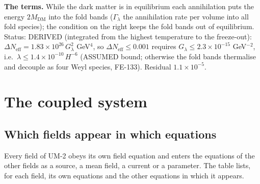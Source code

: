 \documentclass[
  10pt,
]{article}
\begin{document}
\textbf{The terms.} While the dark matter is in equilibrium each
annihilation puts the energy \(2M_{\mathrm{DM}}\) into the fold bands
(\(\Gamma_\lambda\) the annihilation rate per volume into all fold
species); the condition on the right keeps the fold bands out of
equilibrium. Status: DERIVED (integrated from the highest temperature to
the freeze-out):
\(\Delta N_{\mathrm{eff}} = 1.83\times10^{26}\,G_\lambda^2\) GeV\(^4\),
so \(\Delta N_{\mathrm{eff}} \le 0.001\) requires
\(G_\lambda \le 2.3\times10^{-15}\) GeV\(^{-2}\),
i.e.~\(\lambda \le 1.4\times10^{-10}\,H^{-6}\) (ASSUMED bound; otherwise
the fold bands thermalise and decouple as four Weyl species, FE-133).
Residual \(1.1\times10^{-5}\).

\hypertarget{the-coupled-system}{%
\section{The coupled system}\label{the-coupled-system}}

\hypertarget{which-fields-appear-in-which-equations}{%
\subsection{Which fields appear in which
equations}\label{which-fields-appear-in-which-equations}}

Every field of UM-2 obeys its own field equation and enters the
equations of the other fields as a source, a mean field, a current or a
parameter. The table lists, for each field, its own equations and the
other equations in which it appears.
\end{document}
